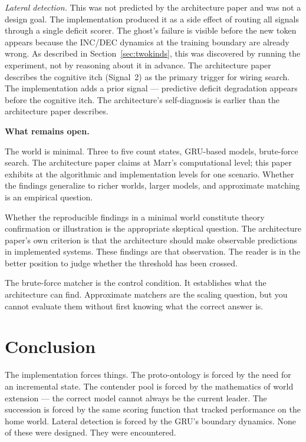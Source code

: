 \documentclass[12pt, a4paper]{article}
\begin{document}
\textit{Lateral detection.} This was not predicted by the architecture paper
and was not a design goal. The implementation produced it as a side effect of
routing all signals through a single deficit scorer. The ghost's failure is
visible before the new token appears because the INC/DEC dynamics at the
training boundary are already wrong. As described in
Section~\ref{sec:twokinds}, this was discovered by running the experiment, not
by reasoning about it in advance. The architecture paper describes the
cognitive itch (Signal~2) as the primary trigger for wiring search. The
implementation adds a prior signal --- predictive deficit degradation appears
before the cognitive itch. The architecture's self-diagnosis is earlier than
the architecture paper describes.

\textbf{What remains open.}

The world is minimal. Three to five count states, GRU-based models, brute-force
search. The architecture paper claims at Marr's computational level; this paper
exhibits at the algorithmic and implementation levels for one scenario. Whether
the findings generalize to richer worlds, larger models, and approximate
matching is an empirical question.

Whether the reproducible findings in a minimal world constitute theory
confirmation or illustration is the appropriate skeptical question. The
architecture paper's own criterion is that the architecture should make
observable predictions in implemented systems. These findings are that
observation. The reader is in the better position to judge whether the
threshold has been crossed.

The brute-force matcher is the control condition. It establishes what the
architecture can find. Approximate matchers are the scaling question, but you
cannot evaluate them without first knowing what the correct answer is.

\section{Conclusion}
\label{sec:conclusion}

The implementation forces things. The proto-ontology is forced by the need for
an incremental state. The contender pool is forced by the mathematics of world
extension --- the correct model cannot always be the current leader. The
succession is forced by the same scoring function that tracked performance on
the home world. Lateral detection is forced by the GRU's boundary dynamics.
None of these were designed. They were encountered.
\end{document}
